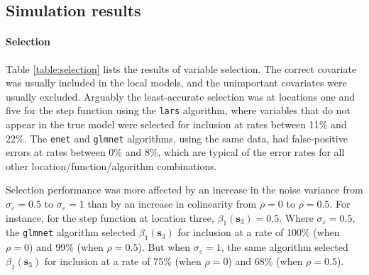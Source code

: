 \documentclass[authoryear, review, 11pt]{elsarticle}
\begin{document}
	\subsection{Simulation results}
	
	\paragraph{Selection} Table \ref{table:selection} lists the results of variable selection. The correct covariate was usually included in the local models, and the unimportant covariates were usually excluded. Arguably the least-accurate selection was at locations one and five for the step function using the {\tt lars} algorithm, where variables that do not appear in the true model were selected for inclusion at rates between 11\% and 22\%. The {\tt enet} and {\tt glmnet} algorithms, using the same data, had false-positive errors at rates between 0\% and 8\%, which are typical of the error rates for all other location/function/algorithm combinations.
	
	Selection performance was more affected by an increase in the noise variance from $\sigma_{\varepsilon}=0.5$ to $\sigma_{\varepsilon}=1$ than by an increase in colinearity from $\rho = 0$ to $\rho = 0.5$. For instance, for the step function at location three, $\beta_1(\bm{s}_3) = 0.5$. Where $\sigma_{\varepsilon}=0.5$, the {\tt glmnet} algorithm selected $\beta_1(\bm{s}_3) $ for inclusion at a rate of 100\% (when $\rho = 0$) and 99\% (when $\rho = 0.5$). But when $\sigma_{\varepsilon}=1$, the same algorithm selected $\beta_1(\bm{s}_3)$ for inclusion at a rate of 75\% (when $\rho = 0$) and 68\% (when $\rho = 0.5$).
	
\end{document}
